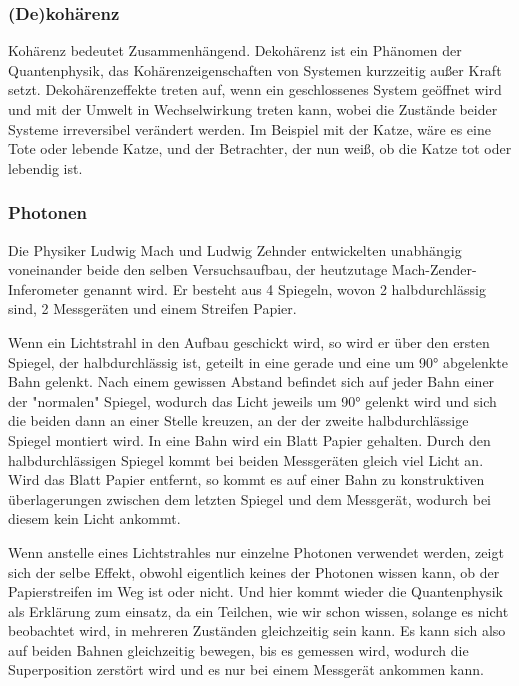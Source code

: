 \subsubsection{(De)kohärenz}

Kohärenz bedeutet Zusammenhängend. Dekohärenz ist ein Phänomen der Quantenphysik, das Kohärenzeigenschaften von Systemen kurzzeitig außer Kraft setzt. Dekohärenzeffekte treten auf, wenn ein geschlossenes System geöffnet wird und mit der Umwelt in Wechselwirkung treten kann, wobei die Zustände beider Systeme irreversibel verändert werden.
Im Beispiel mit der Katze, wäre es eine Tote oder lebende Katze, und der Betrachter, der nun weiß, ob die Katze tot oder lebendig ist.

\subsubsection{Photonen}

Die Physiker Ludwig Mach und Ludwig Zehnder entwickelten unabhängig voneinander beide den selben Versuchsaufbau, der heutzutage Mach-Zender-Inferometer genannt wird. Er besteht aus 4 Spiegeln, wovon 2 halbdurchlässig sind, 2 Messgeräten und einem Streifen Papier.

Wenn ein Lichtstrahl in den Aufbau geschickt wird, so wird er über den ersten Spiegel, der halbdurchlässig ist, geteilt in eine gerade und eine um 90° abgelenkte Bahn gelenkt. Nach einem gewissen Abstand befindet sich auf jeder Bahn einer der "normalen" Spiegel, wodurch das Licht jeweils um 90° gelenkt wird und sich die beiden dann an einer Stelle kreuzen, an der der zweite halbdurchlässige Spiegel montiert wird. In eine Bahn wird ein Blatt Papier gehalten. Durch den halbdurchlässigen Spiegel kommt bei beiden Messgeräten gleich viel Licht an. Wird das Blatt Papier entfernt, so kommt es auf einer Bahn zu konstruktiven überlagerungen zwischen dem letzten Spiegel und dem Messgerät, wodurch bei diesem kein Licht ankommt.

Wenn anstelle eines Lichtstrahles nur einzelne Photonen verwendet werden, zeigt sich der selbe Effekt, obwohl eigentlich keines der Photonen wissen kann, ob der Papierstreifen im Weg ist oder nicht. Und hier kommt wieder die Quantenphysik als Erklärung zum einsatz, da ein Teilchen, wie wir schon wissen, solange es nicht beobachtet wird, in mehreren Zuständen gleichzeitig sein kann. Es kann sich also auf beiden Bahnen gleichzeitig bewegen, bis es gemessen wird, wodurch die Superposition zerstört wird und es nur bei einem Messgerät ankommen kann.

